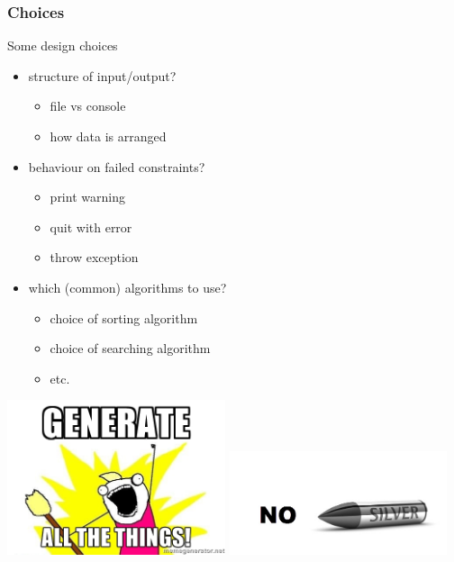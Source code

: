 \documentclass{beamer}
\begin{document}
\begin{frame}
\frametitle{Choices}
{\Large Some design choices}
\begin{itemize}
\item structure of input/output?
\begin{itemize}
\item file vs console
\item how data is arranged
\end{itemize}
\pause
\item behaviour on failed constraints?
\begin{itemize}
\item print warning
\item quit with error
\item throw exception
\end{itemize}
\pause
\item which (common) algorithms to use?
\begin{itemize}
\item choice of sorting algorithm
\item choice of searching algorithm
\item etc.
\end{itemize}
\end{itemize}
\end{frame}



% 

\begin{frame}
\includegraphics[width=0.48\textwidth]{generate_all_the_things.jpg}
\includegraphics[width=0.48\textwidth]{no_silver_bullet.jpg}
\end{frame}
\end{document}
